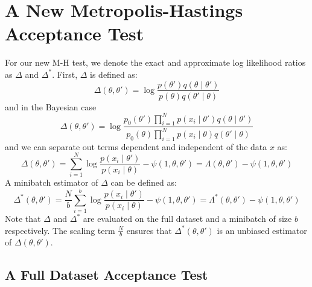 \documentclass{article}
\begin{document}




\section{A New Metropolis-Hastings Acceptance Test}\label{sec:our_algorithm}

For our new M-H test, we denote the exact and approximate log likelihood ratios as $\Delta$ and $\Delta^*$.
First, $\Delta$ is defined as:
\begin{equation}\label{eq:delta0}
  \Delta(\theta,\theta') = \log\frac{p(\theta')q(\theta\mid\theta')}{p(\theta)q(\theta'\mid\theta)}
\end{equation}
and in the Bayesian case
\begin{equation}\label{eq:delta1}
\Delta(\theta,\theta')  =
\log \frac{p_0(\theta')\prod_{i=1}^N p(x_i \mid \theta')q(\theta \mid
  \theta')}{p_0(\theta)\prod_{i=1}^N p(x_i \mid \theta)q(\theta' \mid\theta)}
  \end{equation}
and we can separate out terms dependent and independent of the data $x$ as:
\begin{equation}\label{eq:delta2}
  \Delta(\theta,\theta') = \sum_{i=1}^N\log\frac{p(x_i\mid\theta')}{p(x_i\mid\theta)} - \psi(1,\theta,\theta') =
  \Lambda(\theta,\theta') -  \psi(1,\theta,\theta')
\end{equation}
A minibatch estimator of $\Delta$ can be defined as:
\begin{equation}\label{eq:delta3}
    \Delta^*(\theta,\theta') =
\frac{N}{b}\sum_{i=1}^b\log\frac{p(x_i\mid\theta')}{p(x_i\mid\theta)} - \psi(1,\theta,\theta') =
\Lambda^*(\theta,\theta') -     \psi(1,\theta,\theta')
\end{equation}
Note that $\Delta$ and $\Delta^*$ are evaluated on the full dataset and a minibatch of size $b$
respectively. The scaling term $\frac{N}{b}$ ensures that $\Delta^*(\theta,\theta')$ is an
unbiased estimator of $\Delta(\theta,\theta')$.

\subsection{A Full Dataset Acceptance Test}\label{ssec:deltas_full}
\end{document}
